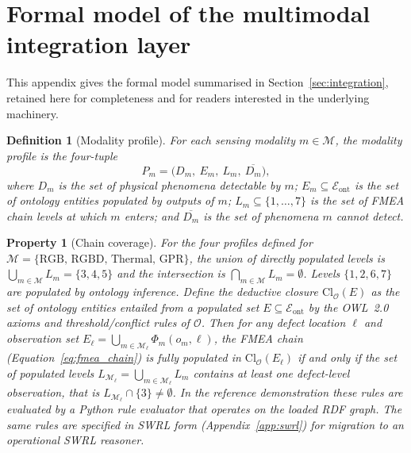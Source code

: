 \documentclass[11pt,a4paper]{article}
\newtheorem{definition}{Definition}
\newtheorem{property}{Property}
\begin{document}
\section{Formal model of the multimodal integration layer}
\label{app:formal}

This appendix gives the formal model summarised in
Section~\ref{sec:integration}, retained here for completeness and for
readers interested in the underlying machinery. 

\begin{definition}[Modality profile]
\label{def:profile}
For each sensing modality $m \in \mathcal{M}$, the
\emph{modality profile} is the four-tuple
\begin{equation}
  P_m = \big( D_m,\ E_m,\ L_m,\ \overline{D_m} \big),
  \label{eq:profile}
\end{equation}
where $D_m$ is the set of physical phenomena detectable by $m$;
$E_m \subseteq \mathcal{E}_{\text{ont}}$ is the set of ontology
entities populated by outputs of $m$; $L_m \subseteq \{1,\dots,7\}$
is the set of FMEA chain levels at which $m$ enters; and
$\overline{D_m}$ is the set of phenomena $m$ cannot detect.
\end{definition}

\begin{property}[Chain coverage]
\label{prop:complement_v3}
For the four profiles defined for $\mathcal{M}=\{\text{RGB, RGBD, Thermal, GPR}\}$, the union of directly populated levels is $\bigcup_{m \in \mathcal{M}} L_m =
\{3,4,5\}$ and the intersection is $\bigcap_{m \in \mathcal{M}} L_m
= \emptyset$. Levels $\{1,2,6,7\}$ are populated by ontology
inference. Define the deductive closure $\mathrm{Cl}_\mathcal{O}(E)$
as the set of ontology entities entailed from a populated set
$E \subseteq \mathcal{E}_{\text{ont}}$ by the OWL~2.0 axioms and
threshold/conflict rules of $\mathcal{O}$. Then for any defect location $\ell$
and observation set $E_\ell = \bigcup_{m \in \mathcal{M}_\ell}
\Phi_m(o_m,\ell)$, the FMEA chain
(Equation~\ref{eq:fmea_chain}) is fully populated in
$\mathrm{Cl}_\mathcal{O}(E_\ell)$ if and only if the set of
populated levels $L_{\mathcal{M}_\ell} = \bigcup_{m \in
\mathcal{M}_\ell} L_m$ contains at least one defect-level
observation, that is $L_{\mathcal{M}_\ell} \cap \{3\} \neq
\emptyset$. In the reference demonstration these rules are evaluated by a Python rule evaluator that operates on the loaded RDF graph. The same rules are specified in SWRL form (Appendix~\ref{app:swrl}) for migration to an operational SWRL reasoner.
\end{property}
\end{document}

